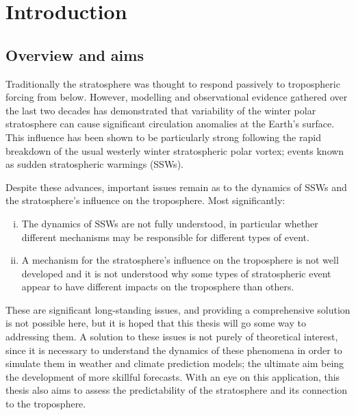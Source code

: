 \chapter{Introduction}
\label{cha:intro}

\section{Overview and aims}


Traditionally the stratosphere was thought to respond passively to tropospheric
forcing from below. However, modelling and observational evidence gathered over
the last two decades has demonstrated that variability of the winter polar
stratosphere can cause significant circulation anomalies at the Earth's
surface. This influence has been shown to be particularly strong following the
rapid breakdown of the usual westerly winter stratospheric polar vortex; events
known as sudden stratospheric warmings (SSWs).

Despite these advances, important issues remain as to the dynamics of SSWs
and the stratosphere's influence on the troposphere. Most significantly:
\begin{enumerate}[i.]
\item The dynamics of SSWs are not fully understood, in particular whether
  different mechanisms may be responsible for different types of event.
\item A mechanism for the stratosphere's influence on the troposphere is not
  well developed and it is not understood why some types of stratospheric event
  appear to have different impacts on the troposphere than others.
\end{enumerate}
These are significant long-standing issues, and providing a comprehensive
solution is not possible here, but it is hoped that this thesis will go some way
to addressing them. A solution to these issues is not purely of theoretical
interest, since it is necessary to understand the dynamics of these phenomena in
order to simulate them in weather and climate prediction models; the ultimate
aim being the development of more skillful forecasts. With an eye on this
application, this thesis also aims to assess the predictability of the
stratosphere and its connection to the troposphere.

